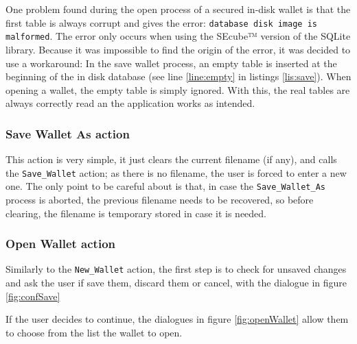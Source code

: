 One problem found during the open process of a secured in-disk wallet is that the first table is always corrupt and gives the error: \texttt{database disk image is malformed}. The error only occurs when using the SEcube™ version of the SQLite library. Because it was impossible to find the origin of the error, it was decided to use a workaround: In the save wallet process, an empty table is inserted at the beginning of the in disk database (see line \ref{line:empty} in listings \ref{lis:save}). When opening a wallet, the empty table is simply ignored. With this, the real tables are always correctly read an the application works as intended.


\subsubsection*{Save Wallet As action}

This action is very simple, it just clears the current filename (if any), and calls the \texttt{Save\_Wallet} action; as there is no filename, the user is forced to enter a new one. The only point to be careful about is that, in case the \texttt{Save\_Wallet\_As} process is aborted, the previous filename needs to be recovered, so before clearing, the filename is temporary stored in case it is needed.

\subsubsection*{Open Wallet action}
Similarly to the \texttt{New\_Wallet} action, the first step is to check for unsaved changes and ask the user if save them, discard them or cancel, with the dialogue in figure \ref{fig:confSave}

If the user decides to continue, the dialogues in figure \ref{fig:openWallet} allow them to choose from the list the wallet to open.

